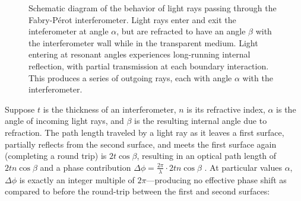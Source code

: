 \documentclass[11pt]{article}
\begin{document}
\begin{figure}[H]
\centering
\caption{Schematic diagram of the behavior of light rays passing through the Fabry-Pérot interferometer. Light rays enter and exit the inteferometer at angle $\alpha$, but are refracted to have an angle $\beta$ with the interferometer wall while in the transparent medium. Light entering at resonant angles experiences long-running internal reflection, with partial transmission at each boundary interaction. This produces a series of outgoing rays, each with angle $\alpha$ with the interferometer.}
\label{fig:fb_plates}
\end{figure}

Suppose $t$ is the thickness of an interferometer, $n$ is its refractive index, $\alpha$ is the angle
of incoming light rays, and $\beta$ is the resulting internal angle due to refraction. The path length traveled by a light ray as it leaves a first surface, partially reflects from the second surface, and meets the first surface again (completing a round trip) is $2t \cos \beta$, resulting in an optical path length of $2tn \cos \beta$ and a phase contribution $\Delta \phi = \frac{2 \pi}{\lambda} \cdot 2tn \cos \beta$ \cite{mel,leybold}. At particular values $\alpha$, $\Delta \phi$ is exactly an integer multiple of $2 \pi$---producing no effective phase shift as compared to before the round-trip between the first and second surfaces:
\end{document}
